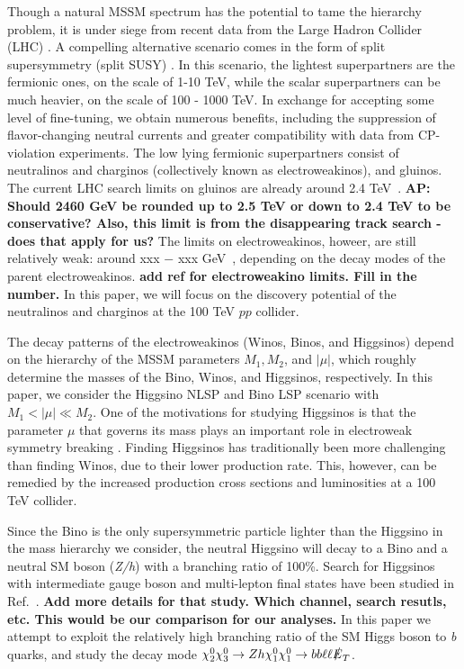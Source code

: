 \documentclass[a4paper,11pt]{article}
\newcommand{\Shufang}[1]{{\bf\color{Maroon}  #1}}
\newcommand{\Adarsh}[1]{{\bf\color{RoyalBlue} AP: #1}}
\newcommand{\met}{{\slashed{E}_T}}
\begin{document}
Though a natural MSSM spectrum has the potential to tame the hierarchy
problem, it is under siege from recent data from the Large Hadron
Collider (LHC) \cite{Aaboud:2018ujj, Sirunyan:2018vjp}. 
A compelling alternative scenario comes in the form of
split supersymmetry (split SUSY) \citep{Wells:2003tf,
ArkaniHamed:2004yi, Giudice:2004tc}. In this scenario, the lightest
superpartners are the fermionic ones, on the
scale of 1-10 TeV, while the scalar superpartners can be much heavier,
on the scale of 100 - 1000 TeV. In exchange for accepting some level of
fine-tuning, we obtain numerous benefits, including the suppression of
flavor-changing neutral currents and greater compatibility with data
from CP-violation experiments.  The low lying 
fermionic superpartners consist of neutralinos and charginos (collectively
known as electroweakinos), and gluinos. The current LHC search limits on
gluinos are already around 2.4 TeV~\cite{CMS-PAS-SUS-19-005}. \Adarsh{Should
2460 GeV be rounded up to 2.5 TeV or down to 2.4 TeV to be conservative? Also,
this limit is from the disappearing track search - does that apply for us?} The
limits on electroweakinos,
howeer, are still relatively weak: around xxx $-$ xxx GeV~\cite{}, depending on
the decay modes of the parent electroweakinos.  \Shufang{add ref for 
electroweakino limits. Fill in the number.} In this paper, we will
focus on the discovery potential of the neutralinos and charginos at the 100
TeV $pp$ collider. 

The decay patterns of the electroweakinos (Winos, Binos, and Higgsinos)
depend on the hierarchy of the MSSM parameters $M_1, M_2$, and $|\mu|$, which 
roughly determine the masses of the Bino, Winos, and Higgsinos, respectively.
In this paper, we consider the Higgsino NLSP and Bino LSP scenario with $M_1 < |\mu| \ll M_2$.
One of the motivations for studying Higgsinos is that the parameter $\mu$ 
that governs its mass plays an important role in electroweak symmetry breaking 
\citep{Acharya:2014pua}. Finding Higgsinos has traditionally been more challenging 
than finding Winos, due to their lower production rate. This, however, can 
be remedied by the increased  production cross sections and luminosities 
at a 100 TeV collider.


 

Since the Bino is the only supersymmetric particle lighter than the Higgsino in the mass hierarchy we consider, the neutral Higgsino will decay to a Bino and a neutral SM boson (\emph{Z/h}) with a branching ratio of 100\%. 
Search for Higgsinos with intermediate gauge boson and  multi-lepton final states have been studied in Ref.~\cite{Gori:2014oua}. \Shufang{Add more details for that study.  Which channel, search resutls, etc.  This would be our comparison for our analyses.}  In this paper we attempt to exploit the relatively high branching ratio of 
the SM Higgs boson to \emph{b} quarks, and study the decay mode $\chi_2^0\chi_3^0\rightarrow Zh \chi_1^0\chi_1^0\rightarrow bb\ell\ell \met$.
\end{document}
